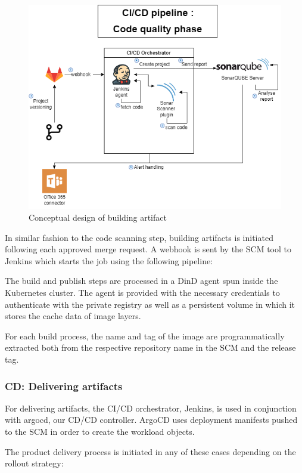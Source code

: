 \begin{figure}[H]\centering
\includegraphics[width=1.0\textwidth,angle=00]{assets/f48.png}
\caption{Conceptual design of building artifact }
\label{fig:Conceptual design of building artifact }
\end{figure}

In similar fashion to the code scanning step, building artifacts is initiated following each approved merge request. A webhook is sent by the SCM tool to Jenkins which starts the job using the following pipeline: 

The build and publish steps are processed in a DinD agent spun inside the Kubernetes cluster. The agent is provided with the necessary credentials to authenticate with the private registry as well as a persistent volume in which it stores the cache data of image layers. 

For each build process, the name and tag of the image are programmatically extracted both from the respective repository name in the SCM and the release tag. 

\subsubsection{CD: Delivering artifacts }

For delivering artifacts, the CI/CD orchestrator, Jenkins, is used in conjunction with argocd, our CD/CD controller. ArgoCD uses deployment manifests pushed to the SCM in order to create the workload objects. 

The product delivery process is initiated in any of these cases depending on the rollout strategy: 

